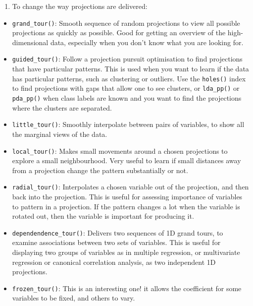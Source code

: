 \documentclass[
  letterpaper,
]{krantz}
\providecommand{\tightlist}{%
  \setlength{\itemsep}{0pt}\setlength{\parskip}{0pt}}\usepackage{longtable,booktabs,array}
\begin{document}
\begin{enumerate}
\def\labelenumi{\arabic{enumi}.}
\setcounter{enumi}{1}
\tightlist
\item
  To change the way projections are delivered:
\end{enumerate}

\begin{itemize}
\tightlist
\item
  \texttt{grand\_tour()}: Smooth sequence of random projections to view
  all possible projections as quickly as possible. Good for getting an
  overview of the high-dimensional data, especially when you don't know
  what you are looking for.
\item
  \texttt{guided\_tour()}: Follow a projection pursuit optimisation to
  find projections that have particular patterns. This is used when you
  want to learn if the data has particular patterns, such as clustering
  or outliers. Use the \texttt{holes()} index to find projections with
  gaps that allow one to see clusters, or \texttt{lda\_pp()} or
  \texttt{pda\_pp()} when class labels are known and you want to find
  the projections where the clusters are separated.
\item
  \texttt{little\_tour()}: Smoothly interpolate between pairs of
  variables, to show all the marginal views of the data.
\item
  \texttt{local\_tour()}: Makes small movements around a chosen
  projections to explore a small neighbourhood. Very useful to learn if
  small distances away from a projection change the pattern
  substantially or not.
\item
  \texttt{radial\_tour()}: Interpolates a chosen variable out of the
  projection, and then back into the projection. This is useful for
  assessing importance of variables to pattern in a projection. If the
  pattern changes a lot when the variable is rotated out, then the
  variable is important for producing it.
\item
  \texttt{dependendence\_tour()}: Delivers two sequences of 1D grand
  tours, to examine associations between two sets of variables. This is
  useful for displaying two groups of variables as in multiple
  regression, or multivariate regression or canonical correlation
  analysis, as two independent 1D projections.
\item
  \texttt{frozen\_tour()}: This is an interesting one! it allows the
  coefficient for some variables to be fixed, and others to vary.
\end{itemize}
\end{document}
